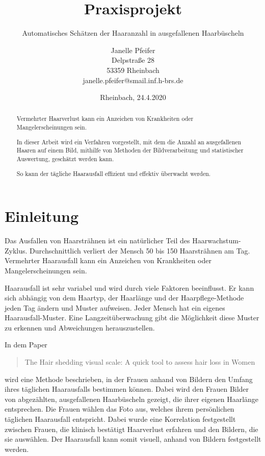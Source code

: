 \documentclass[german,a4paper, 12pt]{llncs}
\title{Praxisprojekt}
\subtitle{Automatisches Schätzen der Haaranzahl in ausgefallenen Haarbüscheln}
\author{\parbox{.9\textwidth}{\centering 
		\large Janelle Pfeifer \\
		\small Delpstraße 28\\
		53359 Rheinbach \\
		janelle.pfeifer@smail.inf.h-brs.de}}
\institute{\parbox{.9\textwidth}{\centering 
		\large Hochschule Bonn-Rhein-Sieg \\
		\normalsize Institute of Visual Computing \\ 
		\small Fachbereich Informatik \\
		Studiengang: Informatik (B.SC.)\\
		\normalsize Rheinbach, 24.4.2020}}
\date{Rheinbach, 24.4.2020}
\begin{document}
	\maketitle
	\newpage
	\begin{abstract}
		Vermehrter Haarverlust kann ein Anzeichen von Krankheiten oder Mangelerscheinungen sein.
		
		In dieser Arbeit wird ein Verfahren vorgestellt, mit dem die Anzahl an ausgefallenen Haaren auf einem Bild, mithilfe von Methoden der Bildverarbeitung und statistischer Auswertung, geschätzt werden kann.
		
		So kann der tägliche Haarausfall effizient und effektiv überwacht werden.

	\end{abstract}
	\newpage
	\tableofcontents
	\newpage

\section{Einleitung}

Das Ausfallen von Haarsträhnen ist ein natürlicher Teil des Haarwachstum-Zyklus. Durchschnittlich verliert der Mensch 50 bis 150 Haarsträhnen am Tag. Vermehrter Haarausfall kann ein Anzeichen von Krankheiten oder Mangelerscheinungen sein.\cite{averageHairshedding}

Haarausfall ist sehr variabel und wird durch viele Faktoren beeinflusst. Er kann sich abhängig von dem Haartyp, der Haarlänge und der Haarpflege-Methode jeden Tag ändern und Muster aufweisen. Jeder Mensch hat ein eigenes Haarausfall-Muster. Eine Langzeitüberwachung gibt die Möglichkeit diese Muster zu erkennen und Abweichungen herauszustellen. \cite{chemicalAlopecia,ironDeficiency,seasoalShedding}

In dem Paper \blockquote{The Hair shedding visual scale: A quick tool to assess hair loss in Women} wird eine Methode beschrieben, in der Frauen anhand von Bildern den Umfang ihres täglichen Haarausfalls bestimmen können. Dabei wird den Frauen Bilder von abgezählten, ausgefallenen Haarbüscheln gezeigt, die ihrer eigenen Haarlänge entsprechen. Die Frauen wählen das Foto aus, welches ihrem persönlichen täglichen Haarausfall entspricht. Dabei wurde eine Korrelation festgestellt zwischen Frauen, die klinisch bestätigt Haarverlust erfahren und den Bildern, die sie auswählen.
Der Haarausfall kann somit visuell, anhand von Bildern festgestellt werden.\cite{visualScale}
\end{document}
